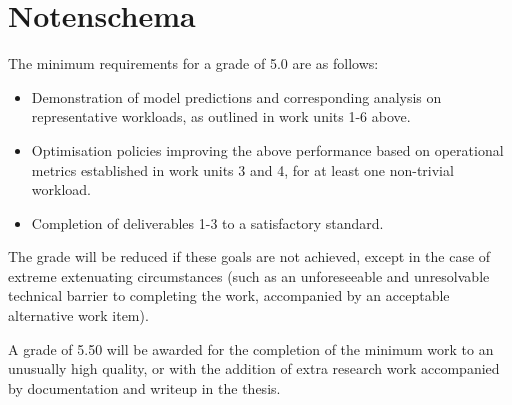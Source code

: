 \documentclass[a4paper,10pt]{article}
\begin{document}
\section{Notenschema}

The minimum requirements for a grade of 5.0 are as follows:

\begin{itemize}
\item Demonstration of model predictions and corresponding analysis on
  representative workloads, as outlined in work units 1-6 above.
\item Optimisation policies improving the above performance based on
  operational metrics established in work units 3 and 4, for at least
  one non-trivial workload.
\item Completion of deliverables 1-3 to a satisfactory standard.
\end{itemize}

The grade will be reduced if these goals are not achieved, except in
the case of extreme extenuating circumstances (such as an
unforeseeable and unresolvable technical barrier to completing the
work, accompanied by an acceptable alternative work item).

A grade of 5.50 will be awarded for the completion of the minimum work
to an unusually high quality, or with the addition of extra research
work accompanied by documentation and writeup in the thesis.

\end{document}
